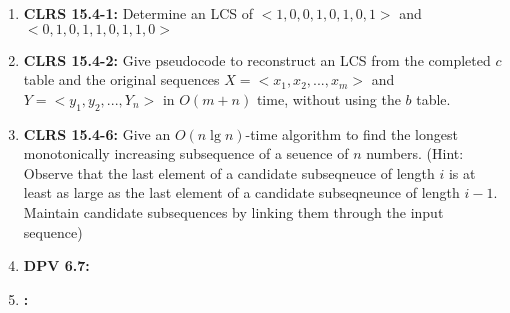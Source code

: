 \documentclass[12pt]{article}
\begin{document}
\begin{enumerate}[1.]
    \item \textbf{CLRS 15.4-1:} Determine an LCS of $<1,0,0,1,0,1,0,1>$ and $<0,1,0,1,1,0,1,1,0>$

    \item \textbf{CLRS 15.4-2:} Give pseudocode to reconstruct an LCS from the completed $c$ table
    and the original sequences $X = <x_1,x_2,...,x_m>$ and $Y = <y_1, y_2, ..., Y_n>$ in $O(m+n)$ time,
    without using the $b$ table.

    \item \textbf{CLRS 15.4-6:} Give an $O(n \lg n)$-time algorithm to find the longest monotonically increasing subsequence
    of a seuence of $n$ numbers. (Hint: Observe that the last element of a candidate subseqneuce of length $i$ is at least as
    large as the last element of a candidate subseqneunce of length $i-1$. Maintain candidate subsequences by linking them
    through the input sequence)

    \item \textbf{DPV 6.7:}

    \item \textbf{:}
\end{enumerate}
\end{document}
